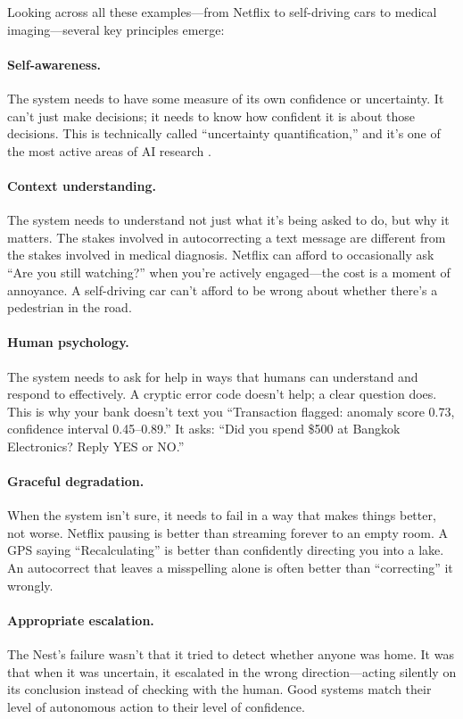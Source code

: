 Looking across all these examples---from Netflix to self-driving cars to medical imaging---several key principles emerge:

\paragraph{Self-awareness.} The system needs to have some measure of its own confidence or uncertainty. It can't just make decisions; it needs to know how confident it is about those decisions. This is technically called ``uncertainty quantification,'' and it's one of the most active areas of AI research \autocite{kendall2017uncertainties}.

\paragraph{Context understanding.} The system needs to understand not just what it's being asked to do, but why it matters. The stakes involved in autocorrecting a text message are different from the stakes involved in medical diagnosis. Netflix can afford to occasionally ask ``Are you still watching?'' when you're actively engaged---the cost is a moment of annoyance. A self-driving car can't afford to be wrong about whether there's a pedestrian in the road.

\paragraph{Human psychology.} The system needs to ask for help in ways that humans can understand and respond to effectively. A cryptic error code doesn't help; a clear question does. This is why your bank doesn't text you ``Transaction flagged: anomaly score 0.73, confidence interval 0.45--0.89.'' It asks: ``Did you spend \$500 at Bangkok Electronics? Reply YES or NO.''

\paragraph{Graceful degradation.} When the system isn't sure, it needs to fail in a way that makes things better, not worse. Netflix pausing is better than streaming forever to an empty room. A GPS saying ``Recalculating'' is better than confidently directing you into a lake. An autocorrect that leaves a misspelling alone is often better than ``correcting'' it wrongly.

\paragraph{Appropriate escalation.} The Nest's failure wasn't that it tried to detect whether anyone was home. It was that when it was uncertain, it escalated in the wrong direction---acting silently on its conclusion instead of checking with the human. Good systems match their level of autonomous action to their level of confidence.

